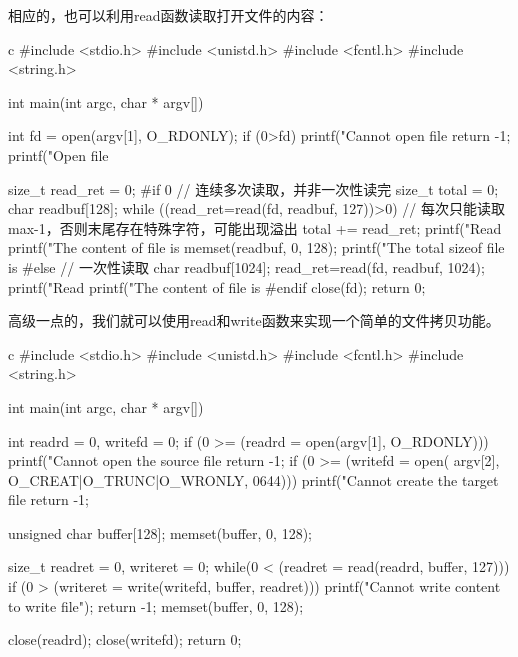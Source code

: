 相应的，也可以利用read函数读取打开文件的内容：
\begin{code-block}{c}
#include <stdio.h>
#include <unistd.h>
#include <fcntl.h>
#include <string.h>

int main(int argc, char * argv[])
{
        int fd = open(argv[1], O_RDONLY);
        if (0>fd)
        {
                printf("Cannot open file %
                return -1;
        }
        printf("Open file %

        size_t read_ret = 0;
#if 0
        // 连续多次读取，并非一次性读完
        size_t total = 0;
        char readbuf[128];
        while ((read_ret=read(fd, readbuf, 127))>0) // 每次只能读取max-1，否则末尾存在特殊字符，可能出现溢出
        {
                total += read_ret;
                printf("Read %
                printf("The content of file is %
                memset(readbuf, 0, 128);
        }
        printf("The total sizeof file is %
#else
        // 一次性读取
        char readbuf[1024];
        read_ret=read(fd, readbuf, 1024);
        printf("Read %
        printf("The content of file is %
#endif
        close(fd);
        return 0;
}
\end{code-block}

高级一点的，我们就可以使用read和write函数来实现一个简单的文件拷贝功能。
\begin{code-block}{c}
#include <stdio.h>
#include <unistd.h>
#include <fcntl.h>
#include <string.h>

int main(int argc, char * argv[])
{
        int readrd = 0, writefd = 0;
        if (0 >= (readrd = open(argv[1], O_RDONLY)))
        {
                printf("Cannot open the source file %
                return -1;
        }
        if (0 >= (writefd = open(
                argv[2], O_CREAT|O_TRUNC|O_WRONLY, 0644)))
        {
                printf("Cannot create the target file %
                return -1;
        }

        unsigned char buffer[128];
        memset(buffer, 0, 128);

        size_t readret = 0, writeret = 0;
        while(0 < (readret = read(readrd, buffer, 127)))
        {
                if (0 > (writeret = write(writefd, buffer, readret)))
                {
                        printf("Cannot write content to write file\n");
                        return -1;
                }
                memset(buffer, 0, 128);
        }

        close(readrd);
        close(writefd);
        return 0;
}
\end{code-block}

